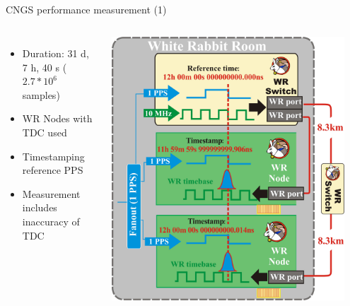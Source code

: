 \documentclass[compress,red]{beamer}
\begin{document}
\subsection{}
\begin{frame}{CNGS performance measurement (1)}

  \begin{columns}[c]
	  \begin{itemize}
		\item Duration: 31 d, 7 h, 40 s ($2.7*10^6$ samples)
		\item WR Nodes with TDC used
		\item Timestamping reference PPS
		\item Measurement includes inaccuracy of TDC
	  \end{itemize}
		\begin{center}
		\includegraphics[width=0.93\textwidth]{measurements/performance_testing_setup-detail_v2.pdf}
		\end{center}
  \end{columns}


\end{frame}
\end{document}
